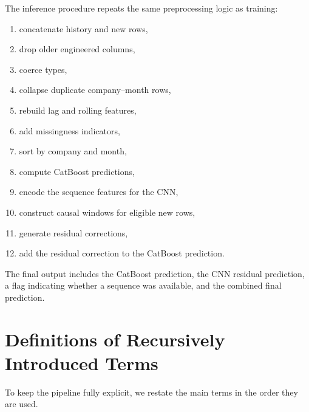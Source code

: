 \documentclass[11pt]{article}
\begin{document}
The inference procedure repeats the same preprocessing logic as training:
\begin{enumerate}
    \item concatenate history and new rows,
    \item drop older engineered columns,
    \item coerce types,
    \item collapse duplicate company--month rows,
    \item rebuild lag and rolling features,
    \item add missingness indicators,
    \item sort by company and month,
    \item compute CatBoost predictions,
    \item encode the sequence features for the CNN,
    \item construct causal windows for eligible new rows,
    \item generate residual corrections,
    \item add the residual correction to the CatBoost prediction.
\end{enumerate}

The final output includes the CatBoost prediction, the CNN residual prediction, a flag indicating whether a sequence was available, and the combined final prediction.

\section{Definitions of Recursively Introduced Terms}

To keep the pipeline fully explicit, we restate the main terms in the order they are used.
\end{document}
